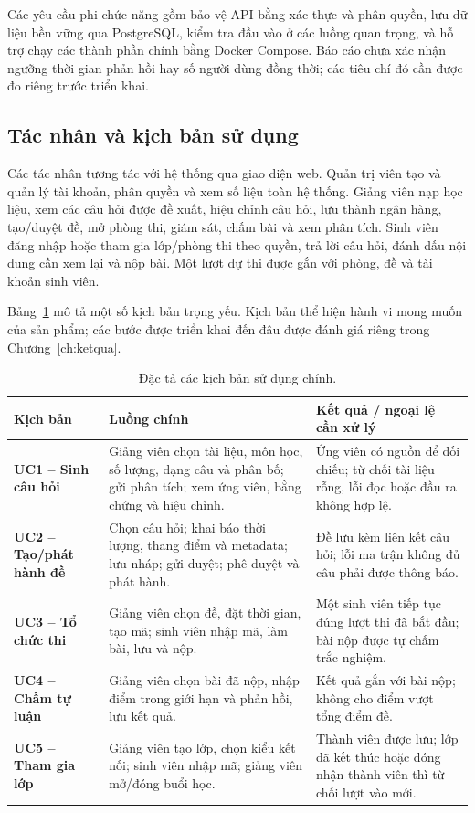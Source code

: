 Các yêu cầu phi chức năng gồm bảo vệ API bằng xác thực và phân quyền, lưu
dữ liệu bền vững qua PostgreSQL, kiểm tra đầu vào ở các luồng quan trọng,
và hỗ trợ chạy các thành phần chính bằng Docker Compose. Báo cáo chưa xác
nhận ngưỡng thời gian phản hồi hay số người dùng đồng thời; các tiêu chí đó
cần được đo riêng trước triển khai.

\subsection{Tác nhân và kịch bản sử dụng}
Các tác nhân tương tác với hệ thống qua giao diện web. Quản trị viên tạo và
quản lý tài khoản, phân quyền và xem số liệu toàn hệ thống. Giảng viên nạp
học liệu, xem các câu hỏi được đề xuất, hiệu chỉnh câu hỏi, lưu thành ngân
hàng, tạo/duyệt đề, mở phòng thi, giám sát, chấm bài và xem phân tích.
Sinh viên đăng nhập hoặc tham gia lớp/phòng thi theo quyền, trả lời câu
hỏi, đánh dấu nội dung cần xem lại và nộp bài. Một lượt dự thi được gắn với
phòng, đề và tài khoản sinh viên.

Bảng~\ref{tab:usecase} mô tả một số kịch bản trọng yếu. Kịch bản thể hiện
hành vi mong muốn của sản phẩm; các bước được triển khai đến đâu được đánh
giá riêng trong Chương~\ref{ch:ketqua}.

\begin{table}[H]
\centering
\caption{Đặc tả các kịch bản sử dụng chính.}
\label{tab:usecase}
\begin{tabularx}{\textwidth}{>{\bfseries\color{daunavy}}p{} X X}
\toprule
\rowcolor{gray100}Kịch bản & Luồng chính & Kết quả / ngoại lệ cần xử lý \\
\midrule
UC1 -- Sinh câu hỏi & Giảng viên chọn tài liệu, môn học, số lượng, dạng câu và phân bố; gửi phân tích; xem ứng viên, bằng chứng và hiệu chỉnh. & Ứng viên có nguồn để đối chiếu; từ chối tài liệu rỗng, lỗi đọc hoặc đầu ra không hợp lệ. \\
UC2 -- Tạo/phát hành đề & Chọn câu hỏi; khai báo thời lượng, thang điểm và metadata; lưu nháp; gửi duyệt; phê duyệt và phát hành. & Đề lưu kèm liên kết câu hỏi; lỗi ma trận không đủ câu phải được thông báo. \\
UC3 -- Tổ chức thi & Giảng viên chọn đề, đặt thời gian, tạo mã; sinh viên nhập mã, làm bài, lưu và nộp. & Một sinh viên tiếp tục đúng lượt thi đã bắt đầu; bài nộp được tự chấm trắc nghiệm. \\
UC4 -- Chấm tự luận & Giảng viên chọn bài đã nộp, nhập điểm trong giới hạn và phản hồi, lưu kết quả. & Kết quả gắn với bài nộp; không cho điểm vượt tổng điểm đề. \\
UC5 -- Tham gia lớp & Giảng viên tạo lớp, chọn kiểu kết nối; sinh viên nhập mã; giảng viên mở/đóng buổi học. & Thành viên được lưu; lớp đã kết thúc hoặc đóng nhận thành viên thì từ chối lượt vào mới. \\
\bottomrule
\end{tabularx}
\end{table}

